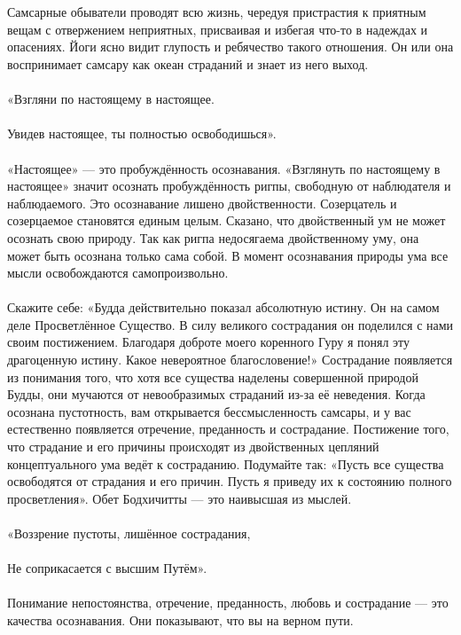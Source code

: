 \newpage
\\ \\ Самсарные обыватели проводят всю жизнь, чередуя пристрастия к приятным вещам с отвержением неприятных, присваивая и избегая что-то в надеждах и опасениях. Йоги ясно видит глупость и ребячество такого отношения. Он или она воспринимает самсару как океан страданий и знает из него выход.
\\ \\ «Взгляни по настоящему в настоящее. 
\\ \\ Увидев настоящее, ты полностью освободишься».
\\ \\ «Настоящее» — это пробуждённость осознавания. «Взглянуть по настоящему в настоящее» значит осознать пробуждённость ригпы, свободную от наблюдателя и наблюдаемого. Это осознавание лишено двойственности. Созерцатель и созерцаемое становятся единым целым. Сказано, что двойственный ум не может осознать свою природу. Так как ригпа недосягаема двойственному уму, она может быть осознана только сама собой. В момент осознавания природы ума все мысли освобождаются самопроизвольно.
\\ \\ Скажите себе: «Будда действительно показал абсолютную истину. Он на самом деле Просветлённое Существо. В силу великого сострадания он поделился с нами своим постижением. Благодаря доброте моего коренного Гуру я понял эту драгоценную истину. Какое невероятное благословение!» Сострадание появляется из понимания того, что хотя все существа наделены совершенной природой Будды, они мучаются от невообразимых страданий из-за её неведения. Когда осознана пустотность, вам открывается бессмысленность самсары, и у вас естественно появляется отречение, преданность и сострадание. Постижение того, что страдание и его причины происходят из двойственных цепляний концептуального ума ведёт к состраданию. Подумайте так: «Пусть все существа освободятся от страдания и его причин. Пусть я приведу их к состоянию полного просветления». Обет Бодхичитты — это наивысшая из мыслей.
\\ \\  «Воззрение пустоты, лишённое сострадания, 
\\ \\ Не соприкасается с высшим Путём».
\\ \\ Понимание непостоянства, отречение, преданность, любовь и сострадание — это качества осознавания. Они показывают, что вы на верном пути.
